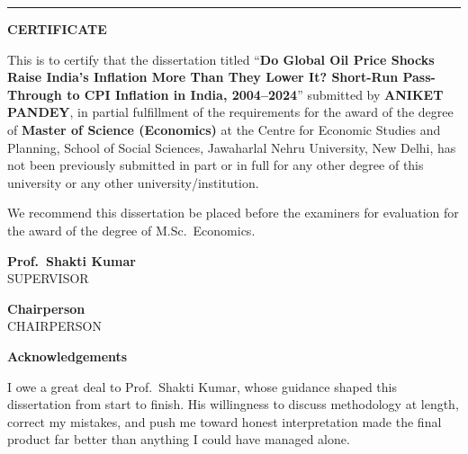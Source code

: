 \documentclass[12pt,a4paper,oneside]{report}
\begin{document}
\vspace{0.4cm}
\noindent\rule{\textwidth}{0.8pt}
\vspace{0.6cm}

\begin{center}
{\LARGE \textbf{CERTIFICATE}}
\end{center}

\vspace{0.8cm}

\noindent This is to certify that the dissertation titled ``\textbf{Do Global Oil Price Shocks Raise India's Inflation More Than They Lower It? Short-Run Pass-Through to CPI Inflation in India, 2004--2024}'' submitted by \textbf{ANIKET PANDEY}, in partial fulfillment of the requirements for the award of the degree of \textbf{Master of Science (Economics)} at the Centre for Economic Studies and Planning, School of Social Sciences, Jawaharlal Nehru University, New Delhi, has not been previously submitted in part or in full for any other degree of this university or any other university/institution.

\vspace{0.8cm}

\noindent We recommend this dissertation be placed before the examiners for evaluation for the award of the degree of M.Sc.\ Economics.

\vspace{3cm}

\noindent
\begin{minipage}[t]{0.45\textwidth}
\textbf{Prof.\ Shakti Kumar}\\
SUPERVISOR
\end{minipage}
\hfill
\begin{minipage}[t]{0.45\textwidth}
\raggedleft
\textbf{Chairperson}\\
CHAIRPERSON
\end{minipage}

\newpage

\thispagestyle{empty}
\begin{center}
{\LARGE \textbf{Acknowledgements}}
\end{center}
\vspace{1cm}

\noindent I owe a great deal to Prof.\ Shakti Kumar, whose guidance shaped this dissertation from start to finish. His willingness to discuss methodology at length, correct my mistakes, and push me toward honest interpretation made the final product far better than anything I could have managed alone.
\end{document}
